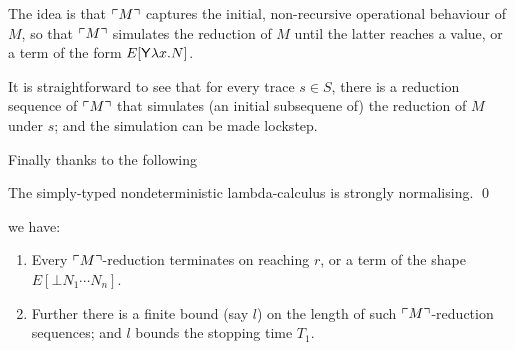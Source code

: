 The idea is that ${\ulcorner{M}\urcorner}$ captures the initial, non-recursive operational behaviour of $M$, so that ${\ulcorner{M}\urcorner}$ simulates the reduction of $M$ until the latter reaches a value, or a term of the form $E[\mathsf{Y} \lambda x. N]$.

It is straightforward to see that for every trace $s \in S$, there is a reduction sequence of ${\ulcorner{M}\urcorner}$ that simulates (an initial subsequene of) the reduction of $M$ under $s$;
and the simulation can be made lockstep.

Finally thanks to the following
\begin{theorem}[de Groote]
\label{thm:de groote}
The simply-typed nondeterministic lambda-calculus is strongly normalising. \qed
\end{theorem}
we have:

\begin{enumerate}
\item Every ${\ulcorner{M}\urcorner}$-reduction terminates on reaching $r$, or a term of the shape $E[\bot N_1 \cdots N_n]$.

\item Further there is a finite bound (say $l$) on the length of such ${\ulcorner{M}\urcorner}$-reduction sequences; and $l$ bounds the stopping time $T_1$.
\end{enumerate}


\iffalse
@inproceedings{DBLP:conf/lfcs/Groote94,
  author    = {Philippe de Groote},
  editor    = {Anil Nerode and
               Yuri V. Matiyasevich},
  title     = {Strong Normalization in a Non-Deterministic Typed Lambda-Calculus},
  booktitle = {Logical Foundations of Computer Science, Third International Symposium,
               LFCS'94, St. Petersburg, Russia, July 11-14, 1994, Proceedings},
  series    = {Lecture Notes in Computer Science},
  volume    = {813},
  pages     = {142--152},
  publisher = {Springer},
  year      = {1994},
  url       = {https://doi.org/10.1007/3-540-58140-5\_15},
  doi       = {10.1007/3-540-58140-5\_15},
  timestamp = {Tue, 14 May 2019 10:00:54 +0200},
  biburl    = {https://dblp.org/rec/conf/lfcs/Groote94.bib},
  bibsource = {dblp computer science bibliography, https://dblp.org}
}
\fi

